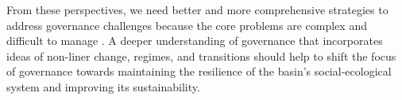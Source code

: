 From these perspectives, we need better and more comprehensive strategies to address governance challenges because the core problems are complex and difficult to manage 
\cite{steffenemergenceevolutionEarth2020,muneepeerakulemergenceresilienceselforganized2020,bodinCollaborativeenvironmentalgovernance2017,biermannNavigatingAnthropoceneImproving2012}. 
A deeper understanding of governance that incorporates ideas of non-liner change, regimes, and transitions should help to shift the focus of governance towards maintaining the resilience of the basin’s social-ecological system and improving its sustainability.

